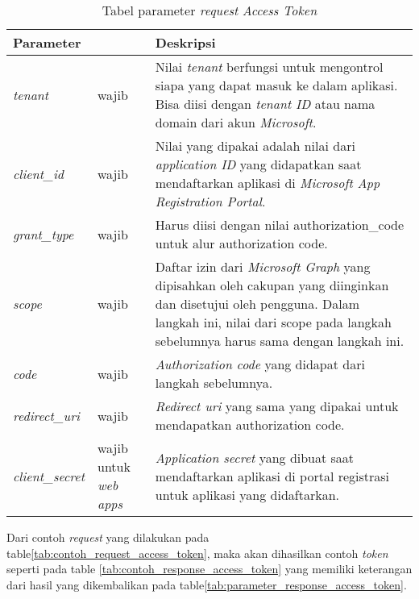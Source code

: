 \documentclass[a4paper,twoside]{article}
\begin{document}
\begin{enumerate}
\begin{table}[H]
	\centering 
	\caption{Tabel parameter \textit{request} \textit{Access Token}}
	\label{tab:parameter_request_access_token}
	\begin{tabular}{|p{3cm}|p{3cm}|p{9cm}|}
	\hline
	 \textbf{Parameter} & & \textbf{Deskripsi}\\ \hline 
	\textit{tenant} & wajib & Nilai \textit{tenant} berfungsi untuk mengontrol siapa yang dapat masuk ke dalam aplikasi. Bisa diisi dengan \textit{tenant ID} atau nama domain dari akun \textit{Microsoft}.\\ \hline 
	\textit{client\_id} & wajib & Nilai yang dipakai adalah nilai dari \textit{application ID} yang didapatkan saat mendaftarkan aplikasi di \textit{Microsoft App Registration Portal}.\\ \hline 
	\textit{grant\_type} & wajib & Harus diisi dengan nilai authorization\_code untuk alur authorization code. \\ \hline
	\textit{scope} & wajib & Daftar izin dari \textit{Microsoft Graph} yang dipisahkan oleh cakupan yang diinginkan dan disetujui oleh pengguna. Dalam langkah ini, nilai dari scope pada langkah sebelumnya harus sama dengan langkah ini.  \\ \hline 
	\textit{code} & wajib & \textit{Authorization code} yang didapat dari langkah sebelumnya. \\ \hline  
	\textit{redirect\_uri} & wajib & \textit{Redirect uri} yang sama yang dipakai untuk mendapatkan authorization code. \\ \hline 
	\textit{client\_secret} & wajib untuk \textit{web apps} & \textit{Application secret} yang dibuat saat mendaftarkan aplikasi di portal registrasi untuk aplikasi yang didaftarkan.\\
	\hline
	\end{tabular}  
\end{table}

Dari contoh \textit{request} yang dilakukan pada table\ref{tab:contoh_request_access_token}, maka akan dihasilkan contoh \textit{token} seperti pada table \ref{tab:contoh_response_access_token} yang memiliki keterangan dari hasil yang dikembalikan pada table\ref{tab:parameter_response_access_token}. 


\end{enumerate}
\end{document}
